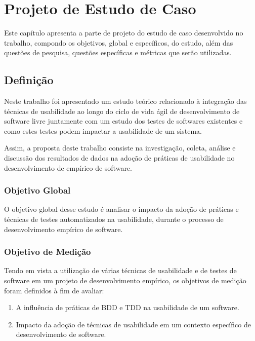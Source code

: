 \chapter{Projeto de Estudo de Caso}


Este capítulo apresenta a parte de projeto do estudo de caso desenvolvido no trabalho, compondo os objetivos, global e específicos, do estudo, além das questões de pesquisa, questões específicas e métricas que serão utilizadas.

\section{Definição}
Neste trabalho foi apresentado um estudo teórico relacionado à integração das técnicas de usabilidade ao longo do ciclo de vida ágil de desenvolvimento de software livre juntamente com um estudo dos testes de softwares existentes e como estes testes podem impactar a usabilidade de um sistema.

Assim, a proposta deste trabalho consiste na investigação, coleta, análise e discussão dos resultados de dados na adoção de práticas de usabilidade no desenvolvimento de empírico de software.

\subsection{Objetivo Global}

O objetivo global desse estudo é analisar o impacto da adoção de práticas e técnicas de testes automatizados na usabilidade, durante o processo de desenvolvimento empírico de software.

\subsection{Objetivo de Medição}

Tendo em vista a utilização de várias técnicas de usabilidade e de testes de software em um projeto de desenvolvimento empírico, os objetivos de medição foram definidos à fim de avaliar:

\begin{enumerate}
\item A influência de práticas de BDD e TDD na usabilidade de um software. 

\item Impacto da adoção de técnicas de usabilidade em um contexto específico de desenvolvimento de software.
\end{enumerate}

